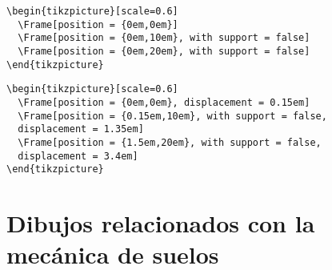 \documentclass[11pt,letterpaper,oneside]{book}
\begin{document}
\begin{lstlisting}[firstnumber=1, title=Dibujo izquierdo]
\begin{tikzpicture}[scale=0.6]
  \Frame[position = {0em,0em}]
  \Frame[position = {0em,10em}, with support = false]
  \Frame[position = {0em,20em}, with support = false]
\end{tikzpicture}
\end{lstlisting}

\begin{lstlisting}[firstnumber=1, title=Dibujo derecho]
\begin{tikzpicture}[scale=0.6]
  \Frame[position = {0em,0em}, displacement = 0.15em]
  \Frame[position = {0.15em,10em}, with support = false,
  displacement = 1.35em]
  \Frame[position = {1.5em,20em}, with support = false,
  displacement = 3.4em]
\end{tikzpicture}
\end{lstlisting}


\chapter{Dibujos relacionados con la mecánica de suelos}
\end{document}
